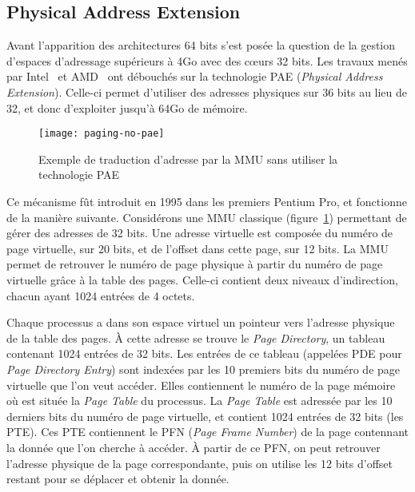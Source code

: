     \subsection{Physical Address Extension}

      Avant l'apparition des architectures 64 bits s'est posée la question de la
      gestion d'espaces d'adressage supérieurs à 4Go avec des c\oe urs 32
      bits. Les travaux menés par Intel~\citep{patent6349380} et
      AMD~\citep{amd2000system} ont débouchés sur la technologie
      PAE (\textit{Physical
        Address Extension}). Celle-ci permet d'utiliser des adresses physiques
      sur 36 bits au lieu de 32, et donc d'exploiter jusqu'à 64Go de mémoire.

      \begin{figure}[ht]
        \centering \texttt{[image: paging-no-pae]}
        \caption{Exemple de traduction d'adresse par la MMU sans utiliser la
          technologie PAE}
        \label{fig:paging-no-pae}
      \end{figure}

      Ce mécanisme fût introduit en 1995 dans les premiers Pentium Pro, et
      fonctionne de la manière suivante. Considérons une MMU classique
      (figure~\ref{fig:paging-no-pae}) permettant de gérer des adresses de 32
      bits. Une adresse virtuelle est composée du numéro de page virtuelle, sur
      20 bits, et de l'offset dans cette page, sur 12 bits. La MMU permet de
      retrouver le numéro de page physique à partir du numéro de page virtuelle
      grâce à la table des pages. Celle-ci contient deux niveaux d'indirection,
      chacun ayant 1024 entrées de 4 octets.

      Chaque processus a dans son espace virtuel un pointeur vers l'adresse
      physique de la table des pages. À cette adresse se trouve le \textit{Page
        Directory}, un tableau contenant 1024 entrées de 32 bits. Les entrées de
      ce tableau (appelées PDE pour
      \textit{Page Directory Entry}) sont indexées par les 10 premiers bits du
      numéro de page virtuelle que l'on veut accéder. Elles contiennent le
      numéro de la page mémoire où est située la \textit{Page Table} du
      processus. La \textit{Page Table} est adressée par les 10 derniers bits du
      numéro de page virtuelle, et contient 1024 entrées de 32 bits (les
      PTE). Ces PTE contiennent le
      PFN (\textit{Page Frame Number}) de
      la page contennant la donnée que l'on cherche à accéder. À partir de ce
      PFN, on peut retrouver l'adresse physique de la page correspondante, puis
      on utilise les 12 bits d'offset restant pour se déplacer et obtenir la
      donnée.

